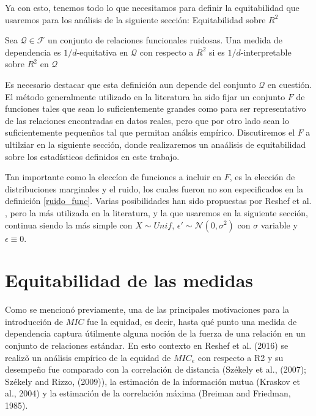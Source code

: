 	Ya con esto, tenemos todo lo que necesitamos para definir la equitabilidad que usaremos para los an\'alisis de la siguiente secci\'on: Equitabilidad sobre $R^2$

	\begin{defn}
		Sea $\mathcal{Q}\in\mathcal{F}$ un conjunto de relaciones funcionales ruidosas. Una medida de dependencia es $1/d$-equitativa en $\mathcal{Q}$ con respecto a $R^2$ si es $1/d$-interpretable sobre $R^2$ en $\mathcal{Q}$ 
	\end{defn}

	Es necesario destacar que esta definici\'on aun depende del conjunto $\mathcal{Q}$ en cuesti\'on. El m\'etodo generalmente utilizado en la literatura ha sido fijar un conjunto $F$ de funciones tales que sean lo suficientemente grandes como para ser representativo de las relaciones encontradas en datos reales, pero que por otro lado sean lo suficientemente pequen\~nos tal que permitan an\'alsis emp\'irico. Discutiremos el $F$ a ultilziar en la siguiente secci\'on, donde realizaremos un ana\'alisis de equitabilidad sobre los estad\'isticos definidos en este trabajo.

	Tan importante como la elecc\'ion de funciones a incluir en $F$, es la elecci\'on de distribuciones marginales y el ruido, los cuales fueron no son especificados en la definici\'on \ref{ruido_func}. Varias posibilidades han sido propuestas por Reshef et al. \cite{Reshef2015a}, pero la m\'as utilizada en la literatura, y la que usaremos en la siguiente secci\'on, continua siendo la m\'as simple con $X\sim Unif$, $\epsilon\prime\sim\mathcal{N}(0,\sigma^2)$ con $\sigma$ variable y $\epsilon\equiv0$. 

	
	\section{Equitabilidad de las medidas}
	
	Como se mencion\'o previamente, una de las principales motivaciones para la introducci\'on de $MIC$ fue la equidad, es decir, hasta qu\'e punto una medida de dependencia captura \'utilmente alguna noci\'on de la fuerza de una relaci\'on en un conjunto de relaciones est\'andar. En esto contexto en Reshef et al. (2016) \cite{Reshef2016} se realiz\~o un an\'alisis emp\'irico de la equidad de $MIC_e$ con respecto a R2 y su desempe\~no fue comparado con la correlaci\'on de distancia (Sz\'ekely et al., (2007)\cite{Szekely2007}; Sz\'ekely and Rizzo, (2009)\cite{Szekely2009}), la estimaci\'on de la informaci\'on mutua (Kraskov et al., 2004) y la estimaci\'on de la correlaci\'on m\'axima (Breiman and Friedman, 1985).

